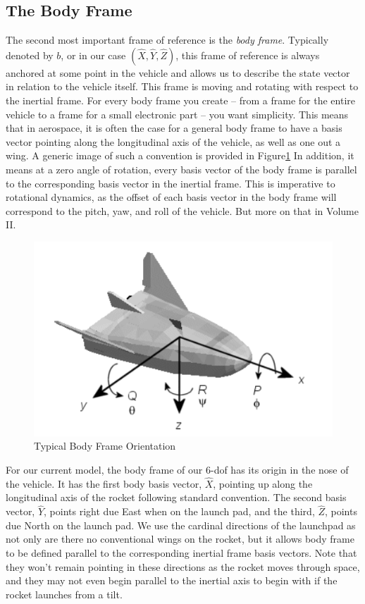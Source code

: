 \documentclass[12pt]{report}
\begin{document}
\subsection{The Body Frame}
The second most important frame of reference is the \textit{body frame}. Typically denoted by $b$, or in our case $(\hat{X},\hat{Y},\hat{Z})$, this frame of reference is always anchored at some point in the vehicle and allows us to describe the \gls{state vector} in relation to the vehicle itself. This frame is moving and rotating with respect to the inertial frame. For every body frame you create – from a frame for the entire vehicle to a frame for a small electronic part – you want simplicity. This means that in aerospace, it is often the case for a general body frame to have a basis vector pointing along the longitudinal axis of the vehicle, as well as one out a wing. A generic image of such a convention is provided in Figure\ref{fig:BodyFrameTypical} In addition, it means at a zero angle of rotation, every basis vector of the body frame is parallel to the corresponding basis vector in the inertial frame. This is imperative to rotational dynamics, as the offset of each basis vector in the body frame will correspond to the pitch, yaw, and roll of the vehicle. But more on that in Volume II.


\begin{figure}[H]
\centering
    
\includegraphics[width=\linewidth]{BodyFrame.png}
    \caption{Typical Body Frame Orientation}
    \label{fig:BodyFrameTypical}
\end{figure}

For our current model, the body frame of our 6-\gls{dof} has its origin in the nose of the vehicle. It has the first body basis vector, $\hat{X}$, pointing up along the longitudinal axis of the rocket following standard convention. The second basis vector, $\hat{Y}$, points right due East when on the launch pad, and the third, $\hat{Z}$, points due North on the launch pad. We use the cardinal directions of the launchpad as not only are there no conventional wings on the rocket, but it allows body frame to be defined parallel to the corresponding inertial frame basis vectors. Note that they won’t remain pointing in these directions as the rocket moves through space, and they may not even begin parallel to the inertial axis to begin with if the rocket launches from a tilt.
\end{document}

